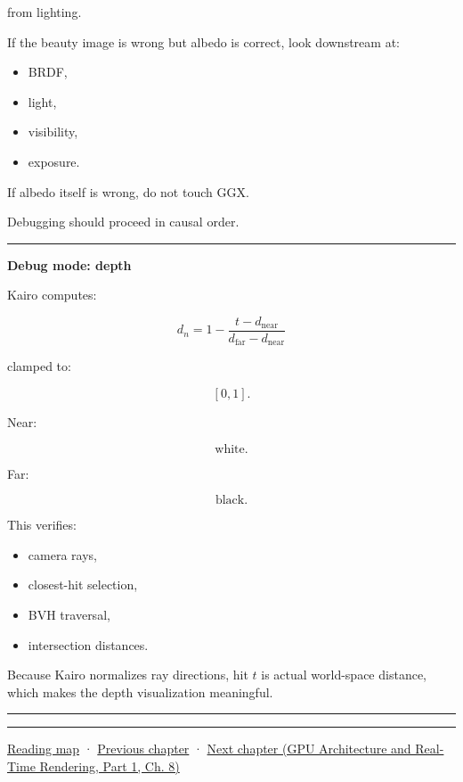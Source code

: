 from lighting.

If the beauty image is wrong but albedo is correct, look downstream at:

\begin{itemize}
\tightlist
\item
  BRDF,
\item
  light,
\item
  visibility,
\item
  exposure.
\end{itemize}

If albedo itself is wrong, do not touch GGX.

Debugging should proceed in causal order.

\begin{center}\rule{0.5\linewidth}{0.5pt}\end{center}

\textbf{Debug mode: depth}

Kairo computes:

\[
d_n
=
1-
\frac{
t-d_{\text{near}}
}{
d_{\text{far}}-d_{\text{near}}
}
\]

clamped to:

\[
[0,1].
\]

Near:

\[
\text{white}.
\]

Far:

\[
\text{black}.
\]

This verifies:

\begin{itemize}
\tightlist
\item
  camera rays,
\item
  closest-hit selection,
\item
  BVH traversal,
\item
  intersection distances.
\end{itemize}

Because Kairo normalizes ray directions, hit \(t\) is actual world-space distance, which makes the depth visualization meaningful.

\begin{center}\rule{0.5\linewidth}{0.5pt}\end{center}

\begin{center}\rule{0.5\linewidth}{0.5pt}\end{center}

\hyperref[volume-reading-map]{Reading map} · \hyperref[03-visual-computing-i-ch009-point-lights-mis-and-environment-lighting]{Previous chapter} · \href{../06-GPU-Architecture-and-Real-Time-Rendering-P01/main.pdf\#nameddest=03-visual-computing-i-ch011-bvh-traversal-and-deterministic-evidence}{Next chapter (GPU Architecture and Real-Time Rendering, Part 1, Ch. 8)}
